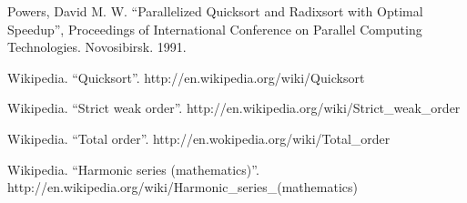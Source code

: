 \documentclass[UTF8]{article}
\begin{document}
\begin{thebibliography}{99}
Powers, David M. W. ``Parallelized Quicksort and Radixsort with Optimal Speedup'', Proceedings of International Conference on Parallel Computing Technologies. Novosibirsk. 1991.

Wikipedia. ``Quicksort''. http://en.wikipedia.org/wiki/Quicksort

Wikipedia. ``Strict weak order''. http://en.wikipedia.org/wiki/Strict\_weak\_order

Wikipedia. ``Total order''. http://en.wokipedia.org/wiki/Total\_order

Wikipedia. ``Harmonic series (mathematics)''. http://en.wikipedia.org/wiki/Harmonic\_series\_(mathematics)

\end{thebibliography}
\end{document}

